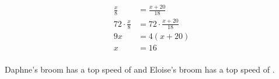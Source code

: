 \documentclass[letterpaper]{exam}
\begin{document}
\begin{questions}
\begin{solution}
        \begin{align*}
          \frac{x}{8}          & = \frac{x + 20}{18} \\
          72 \cdot \frac{x}{8} & = 72 \cdot \frac{x + 20}{18} \\
          9x                   & = 4 (x + 20) \\
          x                    & = 16 \\
        \end{align*}

        Daphne's broom has a top speed of  and Eloise's broom has a top speed of
        .

      \end{solution}

  \end{questions}
\end{document}
